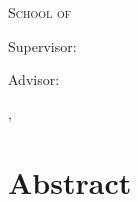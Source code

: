 
\ifstandalone
  \begin{titlepage}
    \centering
    \vspace*{2cm}
    {\scshape\LARGE \getUniversity\par}
    \vspace{0.5cm}
    {\scshape\large School of \getSchool\par}
    \vspace{2.5cm}
    {\huge\bfseries \getTitle\par}
    \vspace{1cm}
    {\Large \getDoctype\par}
    \vfill
    {\large \getAuthor\par}
    \vspace{1cm}
    {\large Supervisor: \getSupervisor\par}
    {\large Advisor: \getAdvisor\par}
    \vspace{1cm}
    {\large \getSubmissionLocation, \getSubmissionDate\par}
  \end{titlepage}
  \chapter*{Abstract}
\else
  
  \frontmatter{}
  
  
  
  
\fi


